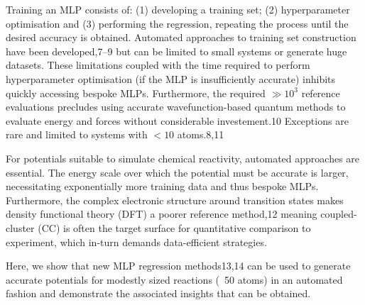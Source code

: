 \documentclass[twoside,twocolumn,9pt]{article}
\begin{document}
Training an MLP consists of: (1) developing a training set; (2) hyperparameter optimisation and (3) performing the regression, repeating the process until the desired accuracy is obtained. Automated approaches to training set construction have been developed,7–9 but can be limited to small systems or generate huge datasets. These limitations coupled with the time required to perform hyperparameter optimisation (if the MLP is insufficiently accurate) inhibits quickly accessing bespoke MLPs. Furthermore, the required $\gg 10^3$ reference evaluations precludes using accurate wavefunction-based quantum methods to evaluate energy and forces without considerable investement.10 Exceptions are rare and limited to systems with $<10$ atoms.8,11 

For potentials suitable to simulate chemical reactivity, automated approaches are essential. The energy scale over which the potential must be accurate is larger, necessitating exponentially more training data and thus bespoke MLPs. Furthermore, the complex electronic structure around transition states makes density functional theory (DFT) a poorer reference method,12 meaning coupled-cluster (CC) is often the target surface for quantitative comparison to experiment, which in-turn demands data-efficient strategies.

Here, we show that new MLP regression methods13,14 can be used to generate accurate potentials for modestly sized reactions (~50 atoms) in an automated fashion and demonstrate the associated insights that can be obtained. 
\end{document}
